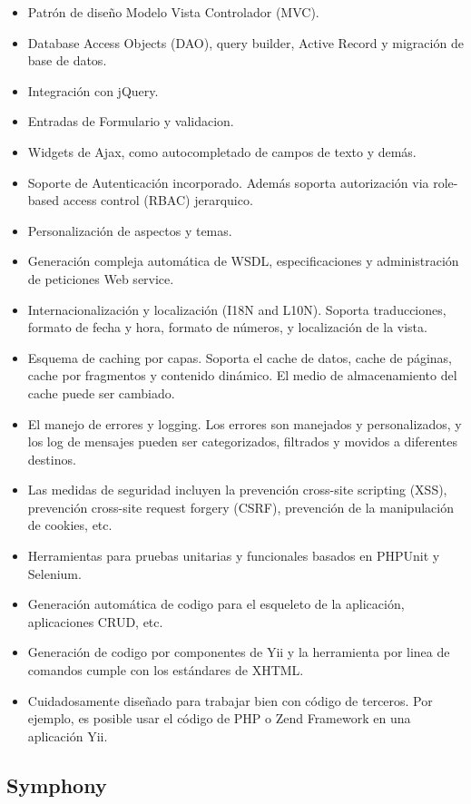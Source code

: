 \begin{itemize}

\item Patrón de diseño Modelo Vista Controlador (MVC).
\item Database Access Objects (DAO), query builder, Active Record y migración de base de datos.
\item Integración con jQuery.
\item Entradas de Formulario y validacion.
\item Widgets de Ajax, como autocompletado de campos de texto y demás.
\item Soporte de Autenticación incorporado. Además soporta autorización via role-based access control (RBAC) jerarquico.
\item Personalización de aspectos y temas.
\item Generación compleja automática de WSDL, especificaciones y administración de peticiones Web service.
\item Internacionalización y localización (I18N and L10N). Soporta traducciones, formato de fecha y hora, formato de números, y localización de la vista.
\item Esquema de caching por capas. Soporta el cache de datos, cache de páginas, cache por fragmentos y contenido dinámico. El medio de almacenamiento del cache puede ser cambiado.
\item El manejo de errores y logging. Los errores son manejados y personalizados, y los log de mensajes pueden ser categorizados, filtrados y movidos a diferentes destinos.
\item Las medidas de seguridad incluyen la prevención cross-site scripting (XSS), prevención cross-site request forgery (CSRF), prevención de la manipulación de cookies, etc.
\item Herramientas para pruebas unitarias y funcionales basados en PHPUnit y Selenium.
\item Generación automática de codigo para el esqueleto de la aplicación, aplicaciones CRUD, etc.
\item Generación de codigo por componentes de Yii y la herramienta por linea de comandos cumple con los estándares de XHTML.
\item Cuidadosamente diseñado para trabajar bien con código de terceros. Por ejemplo, es posible usar el código de PHP o Zend Framework en una aplicación Yii.

\end{itemize}

\subsection{Symphony}

